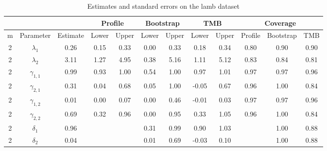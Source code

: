 \documentclass[bimj,fleqn]{w-art}\usepackage[]{graphicx}\usepackage[]{color}
\theoremstyle{plain}
\theoremstyle{definition}
\begin{document}
\begin{table}[ht]
\centering
\begin{tabular}{cccccccccccc}
  &&& \multicolumn{2}{c}{Profile}& \multicolumn{2}{c}{Bootstrap}& \multicolumn{2}{c}{TMB}& \multicolumn{3}{c}{Coverage}\\ \hline
m & Parameter & Estimate & Lower & Upper & Lower & Upper & Lower & Upper & Profile & Bootstrap & TMB \\ 
  \hline
  2 & $\lambda_{1}$ & 0.26 & 0.15 & 0.33 & 0.00 & 0.33 & 0.18 & 0.34 & 0.80 & 0.90 & 0.90 \\ 
    2 & $\lambda_{2}$ & 3.11 & 1.27 & 4.95 & 0.38 & 5.16 & 1.11 & 5.12 & 0.83 & 0.84 & 0.81 \\ 
    2 & $\gamma_{1, 1}$ & 0.99 & 0.93 & 1.00 & 0.54 & 1.00 & 0.97 & 1.01 & 0.97 & 0.97 & 0.96 \\ 
    2 & $\gamma_{2, 1}$ & 0.31 & 0.04 & 0.68 & 0.05 & 1.00 & -0.05 & 0.67 & 0.96 & 1.00 & 0.84 \\ 
    2 & $\gamma_{1, 2}$ & 0.01 & 0.00 & 0.07 & 0.00 & 0.46 & -0.01 & 0.03 & 0.97 & 0.97 & 0.96 \\ 
    2 & $\gamma_{2, 2}$ & 0.69 & 0.32 & 0.96 & 0.00 & 0.95 & 0.33 & 1.05 & 0.96 & 1.00 & 0.84 \\ 
    2 & $\delta_{1}$ & 0.96 &  &  & 0.31 & 0.99 & 0.90 & 1.03 &  & 1.00 & 0.88 \\ 
    2 & $\delta_{2}$ & 0.04 &  &  & 0.01 & 0.69 & -0.03 & 0.10 &  & 1.00 & 0.88 \\ 
   \hline
\end{tabular}
\caption{Estimates and standard errors on the lamb dataset} 
\label{table:lamb_estimates_std_errors}
\end{table}
\end{document}
